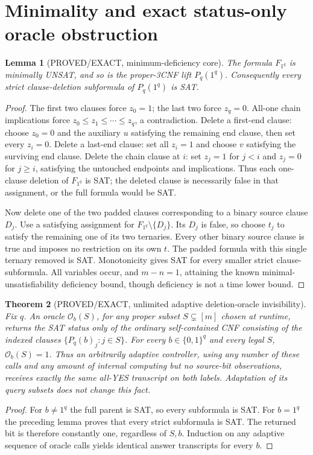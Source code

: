\documentclass[11pt]{article}
\newtheorem{theorem}{Theorem}
\newtheorem{lemma}[theorem]{Lemma}
\begin{document}
\section{Minimality and exact status-only oracle obstruction}
\begin{lemma}[PROVED/EXACT, minimum-deficiency core]
The formula \(F_{1^q}\) is minimally UNSAT, and so is the proper-3CNF lift \(P_q(1^q)\). Consequently every \emph{strict} clause-deletion subformula of \(P_q(1^q)\) is SAT.
\end{lemma}
\begin{proof}
The first two clauses force \(z_0=1\); the last two force \(z_q=0\). All-one chain implications force \(z_0\le z_1\le\cdots\le z_q\), a contradiction. Delete a first-end clause: choose \(z_0=0\) and the auxiliary \(u\) satisfying the remaining end clause, then set every \(z_i=0\). Delete a last-end clause: set all \(z_i=1\) and choose \(v\) satisfying the surviving end clause. Delete the chain clause at \(i\): set \(z_j=1\) for \(j<i\) and \(z_j=0\) for \(j\ge i\), satisfying the untouched endpoints and implications. Thus each one-clause deletion of \(F_{1^q}\) is SAT; the deleted clause is necessarily false in that assignment, or the full formula would be SAT.

Now delete one of the two padded clauses corresponding to a binary source clause \(D_j\). Use a satisfying assignment for \(F_{1^q}\setminus\{D_j\}\). Its \(D_j\) is false, so choose \(t_j\) to satisfy the remaining one of its two ternaries. Every other binary source clause is true and imposes no restriction on its own \(t\). The padded formula with this single ternary removed is SAT. Monotonicity gives SAT for every smaller strict clause-subformula. All variables occur, and \(m-n=1\), attaining the known minimal-unsatisfiability deficiency bound, though deficiency is not a time lower bound.
\end{proof}

\begin{theorem}[PROVED/EXACT, unlimited adaptive deletion-oracle invisibility]
Fix \(q\). An oracle \(\mathcal O_b(S)\), for \emph{any} proper subset \(S\subsetneq[m]\) chosen at runtime, returns the SAT \emph{status only} of the ordinary self-contained CNF consisting of the indexed clauses \(\{P_q(b)_j:j\in S\}\). For every \(b\in\{0,1\}^q\) and every legal \(S\), \(\mathcal O_b(S)=1\). Thus an arbitrarily adaptive controller, using any number of these calls and any amount of internal computing but \emph{no source-bit observations}, receives exactly the same all-YES transcript on both labels. Adaptation of its query subsets does not change this fact.
\end{theorem}
\begin{proof}
For \(b\ne1^q\) the full parent is SAT, so every subformula is SAT. For \(b=1^q\) the preceding lemma proves that every strict subformula is SAT. The returned bit is therefore constantly one, regardless of \(S,b\). Induction on any adaptive sequence of oracle calls yields identical answer transcripts for every \(b\).
\end{proof}
\end{document}
